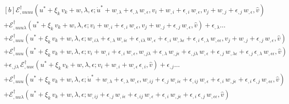 \documentclass[12pt, final]{scrartcl}
\theoremstyle{definition}
\newcommand{\EE}{\mathcal E ^ \dagger}
\begin{document}
\begin{equation}
  \begin{aligned}[b]
    \EE_{,uuuu}(u^\ast + \xi_k \, v_k + w, \lambda, \epsilon; \dot{u}^\ast + w_{,\lambda} + \epsilon_{,\lambda} \, w_{,\epsilon}, v_i + w_{,i} + \epsilon_{,i} \,  w_{,\epsilon}, v_j + w_{,j} + \epsilon_{,j} \, w_{,\epsilon}, \hat{v}) &\\
    + \EE_{,uuu\lambda}(u^\ast + \xi_k \, v_k + w, \lambda, \epsilon; v_i + w_{,i} + \epsilon_{,i} \,  w_{,\epsilon}, v_j + w_{,j} + \epsilon_{,j} \, w_{,\epsilon}, \hat{v}) + \epsilon_{,\lambda} \ldots &\\
    + \EE_{,uuu}(u^\ast + \xi_k \, v_k + w, \lambda, \epsilon; w_{,i\lambda} + \epsilon_{,\lambda} \, w_{,i\epsilon} + \epsilon_{,i\lambda} \,  w_{,\epsilon}  + \epsilon_{,i} \,  w_{,\lambda\epsilon} + \epsilon_{,i} \, \epsilon_{,\lambda} \, w_{,\epsilon\epsilon}, v_j + w_{,j} + \epsilon_{,j} \, w_{,\epsilon}, \hat{v})\\
    + \EE_{,uuu}(u^\ast + \xi_k \, v_k + w, \lambda, \epsilon; v_i + w_{,i} + \epsilon_{,i} \, w_{,\epsilon}, w_{,j\lambda} + \epsilon_{,\lambda} \, w_{,j\epsilon} + \epsilon_{,j\lambda} \,  w_{,\epsilon}  + \epsilon_{,j} \,  w_{,\lambda\epsilon} + \epsilon_{,j} \, \epsilon_{,\lambda} \, w_{,\epsilon\epsilon}, \hat{v})\\
    + \epsilon_{,j\lambda} \, \EE_{,uu\epsilon}(u^\ast + \xi_k \, v_k + w, \lambda, \epsilon; v_i + w_{,i} + w_{,\epsilon} \, \epsilon_{,i}, \hat{v}) + \epsilon_{,j} \ldots &\\
    + \EE_{,uuu}(u^\ast + \xi_k \, v_k + w, \lambda, \epsilon; \dot{u}^\ast + w_{,\lambda} + \epsilon_{,\lambda} \, w_{,\epsilon}, w_{,ij} + \epsilon_{,j} \, w_{,i\epsilon} + \epsilon_{,ij} \, w_{,\epsilon} + \epsilon_{,i} \, w_{,j\epsilon} + \epsilon_{,i} \, \epsilon_{,j} \, w_{,\epsilon\epsilon} , \hat{v}) &\\
    + \EE_{,uu\lambda}(u^\ast + \xi_k \, v_k + w, \lambda, \epsilon; w_{,ij} + \epsilon_{,j} \, w_{,i\epsilon} + \epsilon_{,ij} \, w_{,\epsilon} + \epsilon_{,i} \, w_{,j\epsilon} + \epsilon_{,i} \, \epsilon_{,j} \, w_{,\epsilon\epsilon} , \hat{v}) &\\

\end{aligned}
\end{equation}
\end{document}

